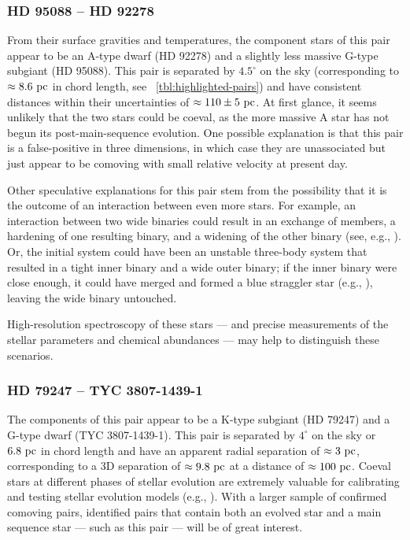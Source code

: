 \documentclass[modern, letterpaper]{aastex61}
\begin{document}
\subsubsection{HD 95088 -- HD 92278}

From their surface gravities and temperatures, the component stars of this pair
appear to be an A-type dwarf (HD 92278) and a slightly less massive G-type
subgiant (HD 95088).
This pair is separated by $4.5^\circ$ on the sky (corresponding to $\approx
8.6~\mathrm{pc}$ in chord length, see \tablename~\ref{tbl:highlighted-pairs}) and have
consistent distances within their uncertainties of $\approx 110 \pm 5~\mathrm{pc}$.
At first glance, it seems unlikely that the two stars could be coeval, as the
more massive A star has not begun its post-main-sequence evolution.
One possible explanation is that this pair is a false-positive in three
dimensions, in which case they are unassociated but just appear to be comoving
with small relative velocity at present day.

Other speculative explanations for this pair stem from the possibility that it
is the outcome of an interaction between even more stars.
For example, an interaction between two wide binaries could result in an
exchange of members, a hardening of one resulting binary, and a widening of the
other binary (see, e.g., \citealt{Nathan??}).
Or, the initial system could have been an unstable three-body system that
resulted in a tight inner binary and a wide outer binary;
if the inner binary were close enough, it could have merged and formed a blue
straggler star (e.g., \citealt{??}), leaving the wide binary untouched.

High-resolution spectroscopy of these stars --- and precise measurements of the
stellar parameters and chemical abundances --- may help to distinguish these
scenarios.

\subsubsection{HD 79247 -- TYC 3807-1439-1}

The components of this pair appear to be a K-type subgiant (HD 79247) and a
G-type dwarf (TYC 3807-1439-1).
This pair is separated by $4^\circ$ on the sky or $6.8~\mathrm{pc}$ in chord length and
have an apparent radial separation of $\approx 3~\mathrm{pc}$, corresponding to a 3D
separation of $\approx 9.8~\mathrm{pc}$ at a distance of $\approx 100~\mathrm{pc}$.
Coeval stars at different phases of stellar evolution are extremely valuable for
calibrating and testing stellar evolution models (e.g., \citealt{Torres:2013}).
With a larger sample of confirmed comoving pairs, identified pairs that contain
both an evolved star and a main sequence star --- such as this pair --- will be
of great interest.
\end{document}
